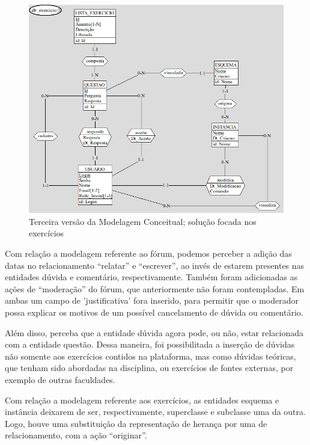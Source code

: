 \documentclass[graduacao,brazil]{ThesisPUC}
\begin{document}
\begin{figure}[H]
    \centering
    \includegraphics[width=\linewidth]{Imagens/ModelagemConceitual_exercicio_v2_0.png}
    \caption{Terceira vers\~{a}o da Modelagem Conceitual; solu\c{c}\~{a}o focada nos exerc\'{i}cios}
\end{figure}

Com rela\c{c}\~{a}o a modelagem referente ao f\'{o}rum, podemos perceber a adi\c{c}\~{a}o das datas no
relacionamento “relatar” e “escrever”, ao inv\'{e}s de estarem presentes nas entidades d\'{u}vida e
coment\'{a}rio, respectivamente. Tamb\'{e}m foram adicionadas as a\c{c}\~{o}es de “modera\c{c}\~{a}o” do f\'{o}rum,
que anteriormente n\~{a}o foram contempladas. Em ambas um campo de 'justificativa' fora inserido,
para permitir que o moderador possa explicar os motivos de um poss\'{i}vel cancelamento de d\'{u}vida
ou coment\'{a}rio.

Al\'{e}m disso, perceba que a entidade d\'{u}vida agora pode, ou n\~{a}o, estar relacionada com a
entidade quest\~{a}o. Dessa maneira, foi possibilitada a inser\c{c}\~{a}o de d\'{u}vidas n\~{a}o somente aos
exerc\'{i}cios contidos na plataforma, mas como d\'{u}vidas te\'{o}ricas, que tenham sido abordadas na
disciplina, ou exerc\'{i}cios de fontes externas, por exemplo de outras faculdades.

Com rela\c{c}\~{a}o a modelagem referente aos exerc\'{i}cios, as entidades esquema e inst\^{a}ncia
deixarem de ser, respectivamente, superclasse e subclasse uma da outra. Logo, houve uma
substitui\c{c}\~{a}o da representa\c{c}\~{a}o de heran\c{c}a por uma de relacionamento, com a a\c{c}\~{a}o “originar”.
\end{document}
